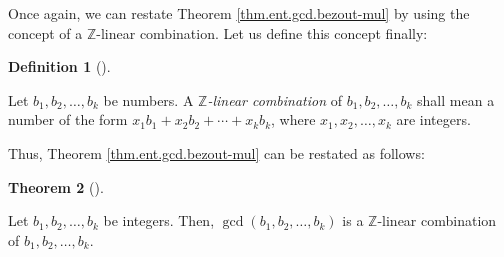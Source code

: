 \documentclass[numbers=enddot,12pt,final,onecolumn,notitlepage]{scrartcl}%
\numberwithin{exer}{subsection}
\theoremstyle{definition}
\newtheorem{theo}{Theorem}[subsection]
\newenvironment{theorem}[1][]
{\begin{theo}[#1]\begin{leftbar}}
{\end{leftbar}\end{theo}}
\newtheorem{defi}[theo]{Definition}
\newenvironment{definition}[1][]
{\begin{defi}[#1]\begin{leftbar}}
{\end{leftbar}\end{defi}}
\begin{document}
Once again, we can restate Theorem \ref{thm.ent.gcd.bezout-mul} by using the
concept of a $\mathbb{Z}$-linear combination. Let us define this concept finally:

\begin{definition}
Let $b_{1},b_{2},\ldots,b_{k}$ be numbers. A $\mathbb{Z}$\textit{-linear
combination} of $b_{1},b_{2},\ldots,b_{k}$ shall mean a number of the form
$x_{1}b_{1}+x_{2}b_{2}+\cdots+x_{k}b_{k}$, where $x_{1},x_{2},\ldots,x_{k}$
are integers.
\end{definition}

Thus, Theorem \ref{thm.ent.gcd.bezout-mul} can be restated as follows:

\begin{theorem}
\label{thm.ent.gcd.bezout-mul'}Let $b_{1},b_{2},\ldots,b_{k}$ be integers.
Then, $\gcd\left(  b_{1},b_{2},\ldots,b_{k}\right)  $ is a $\mathbb{Z}$-linear
combination of $b_{1},b_{2},\ldots,b_{k}$.
\end{theorem}
\end{document}
